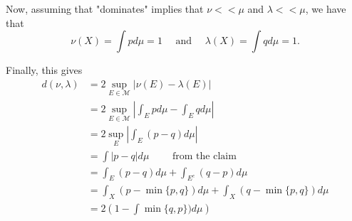 \documentclass[12pt]{Qual}
\begin{document}
\begin{solution}
\begin{enumerate}[label=(\alph*)]
    Now, assuming that "dominates" implies that $\nu<<\mu$ and $\lambda<<\mu$, we have that $$\nu(X)=\int pd\mu=1\quad\text{ and }\quad\lambda(X)=\int qd\mu=1.$$

    Finally, this gives
    \begin{align*}
        d(\nu,\lambda)&=2\sup_{E\in\mathscr{M}}|\nu(E)-\lambda(E)|\\
        &=2\sup_{E\in\mathscr{M}}\left|\int_Epd\mu-\int_Eqd\mu\right|\\
        &=2\sup_E\left|\int_E(p-q)d\mu\right|\\
        &=\int|p-q|d\mu\qquad\text{ from the claim}\\
        &=\int_E(p-q)d\mu+\int_{E^c}(q-p)d\mu\\
        &=\int_X(p-\min\{p,q\})d\mu+\int_X(q-\min\{p,q\})d\mu\\
        &=2\left(1-\int\min\{q,p\})d\mu\right)
    \end{align*}
\end{enumerate}
\end{solution}
\vspace{0.5cm}
\end{document}
